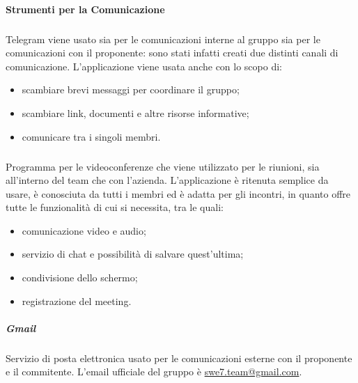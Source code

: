 \paragraph{Strumenti per la Comunicazione}
\subparagraph*{} \hfill \break
Telegram viene usato sia per le comunicazioni interne al gruppo sia per le comunicazioni con il proponente:
sono stati infatti creati due distinti canali di comunicazione. L'applicazione viene usata anche con lo scopo 
di:
\begin{itemize}
    \item scambiare brevi messaggi per coordinare il gruppo;
    \item scambiare link, documenti e altre risorse informative;
    \item comunicare tra i singoli membri.
\end{itemize}

\subparagraph*{} \hfill \break
Programma per le videoconferenze che viene utilizzato per le riunioni, sia all'interno del team che con l'azienda. L'applicazione è ritenuta semplice da usare,
è conosciuta da tutti i membri ed è adatta per gli incontri, in quanto offre tutte le funzionalità di cui si necessita, tra le quali:
\begin{itemize}
    \item comunicazione video e audio;
    \item servizio di chat e possibilità di salvare quest'ultima;
    \item condivisione dello schermo;
    \item registrazione del meeting.
\end{itemize}

\subparagraph*{Gmail} \hfill \break
Servizio di posta elettronica usato per le comunicazioni esterne con il proponente e il commitente. L'email 
ufficiale del gruppo è \href{mailto:swe7.team@gmail.com}{swe7.team@gmail.com}.

